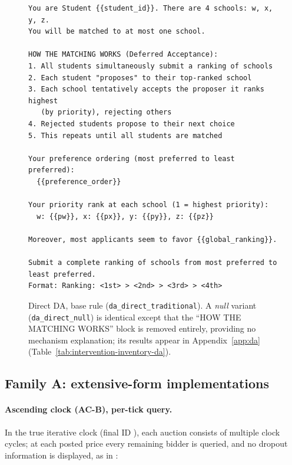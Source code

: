 \begin{figure}[H]
\begin{lstlisting}
You are Student {{student_id}}. There are 4 schools: w, x, y, z.
You will be matched to at most one school.

HOW THE MATCHING WORKS (Deferred Acceptance):
1. All students simultaneously submit a ranking of schools
2. Each student "proposes" to their top-ranked school
3. Each school tentatively accepts the proposer it ranks highest
   (by priority), rejecting others
4. Rejected students propose to their next choice
5. This repeats until all students are matched

Your preference ordering (most preferred to least preferred):
  {{preference_order}}

Your priority rank at each school (1 = highest priority):
  w: {{pw}}, x: {{px}}, y: {{py}}, z: {{pz}}

Moreover, most applicants seem to favor {{global_ranking}}.

Submit a complete ranking of schools from most preferred to
least preferred.
Format: Ranking: <1st> > <2nd> > <3rd> > <4th>
\end{lstlisting}
\caption{Direct DA, base rule (\texttt{da\_direct\_traditional}). A \emph{null} variant (\texttt{da\_direct\_null}) is identical except that the ``HOW THE MATCHING WORKS'' block is removed entirely, providing no mechanism explanation; its results appear in Appendix~\ref{app:da} (Table~\ref{tab:intervention-inventory-da}).}
\label{fig:prompt-da-traditional}
\end{figure}

\subsection{Family A: extensive-form implementations}\label{app:prompts-osp}

\paragraph{Ascending clock (AC-B), per-tick query.} In the true iterative clock (final ID ), each auction consists of multiple clock cycles; at each posted price every remaining bidder is queried, and no dropout information is displayed, as in \citet{breitmoser2022obviousness}:

